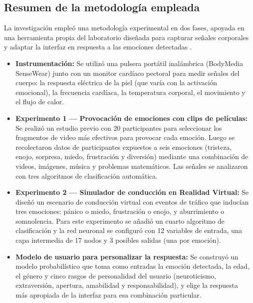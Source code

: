 \subsection{Resumen de la metodología empleada}

La investigación empleó una metodología experimental en dos fases, apoyada en una herramienta propia del laboratorio diseñada para capturar señales corporales y adaptar la interfaz en respuesta a las emociones detectadas \cite{nasoz2004}.

\begin{itemize}
    \item \textbf{Instrumentación:} Se utilizó una pulsera portátil inalámbrica (BodyMedia SenseWear) junto con un monitor cardíaco pectoral para medir señales del cuerpo: la respuesta eléctrica de la piel (que varía con la activación emocional), la frecuencia cardíaca, la temperatura corporal, el movimiento y el flujo de calor.

    \item \textbf{Experimento 1 --- Provocación de emociones con clips de películas:} Se realizó un estudio previo con 20 participantes para seleccionar los fragmentos de video más efectivos para provocar cada emoción. Luego se recolectaron datos de participantes expuestos a seis emociones (tristeza, enojo, sorpresa, miedo, frustración y diversión) mediante una combinación de videos, imágenes, música y problemas matemáticos. Las señales se analizaron con tres algoritmos de clasificación automática.

    \item \textbf{Experimento 2 --- Simulador de conducción en Realidad Virtual:} Se diseñó un escenario de conducción virtual con eventos de tráfico que inducían tres emociones: pánico o miedo, frustración o enojo, y aburrimiento o somnolencia. Para este experimento se añadió un cuarto algoritmo de clasificación y la red neuronal se configuró con 12 variables de entrada, una capa intermedia de 17 nodos y 3 posibles salidas (una por emoción).

    \item \textbf{Modelo de usuario para personalizar la respuesta:} Se construyó un modelo probabilístico que toma como entradas la emoción detectada, la edad, el género y cinco rasgos de personalidad del usuario (neuroticismo, extraversión, apertura, amabilidad y responsabilidad), y elige la respuesta más apropiada de la interfaz para esa combinación particular.
\end{itemize}

